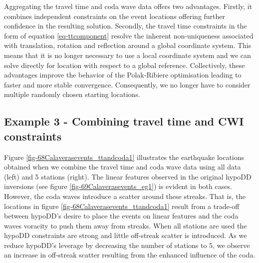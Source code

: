 \documentclass[extra]{gji}
\begin{document}
Aggregating the travel time and coda wave data offers two
advantages. Firstly, it combines independent constraints on the
event locations offering further confidence in the resulting
solution. Secondly, the travel time constraints in the form of
equation \ref{eq-ttcomponent} resolve the inherent non-uniqueness
associated with translation, rotation and reflection around a global
coordinate system. This means that it is no longer necessary to use
a local coordinate system and we can solve directly for location
with respect to a global reference. Collectively, these advantages
improve the behavior of the Polak-Ribiere optimisation leading to
faster and more stable convergence. Consequently, we no longer have
to consider multiple randomly chosen starting locations.


\subsection{Example 3 - Combining travel time and CWI constraints}
\label{sec:CalaverasLoc-CWIandTT} Figure
\ref{fig-68Calaverasevents_ttandcoda1} illustrates the earthquake
locations obtained when we combine the travel time and coda wave
data using all data (left) and 5 stations (right). The linear
features observed in the original hypoDD inversions (see figure
\ref{fig-69Calaverasevents_eg1}) is evident in both cases. However,
the coda waves introduce a scatter around these streaks. That is,
the locations in figure \ref{fig-68Calaverasevents_ttandcoda1}
result from a trade-off between hypoDD's desire to place the events
on linear features and the coda waves voracity to push them away
from streaks. When all stations are used the hypoDD constraints are
strong and little off-streak scatter is introduced. As we reduce
hypoDD's leverage by decreasing the number of stations to 5, we
observe an increase in off-streak scatter resulting from the
enhanced influence of the coda.

\end{document}
